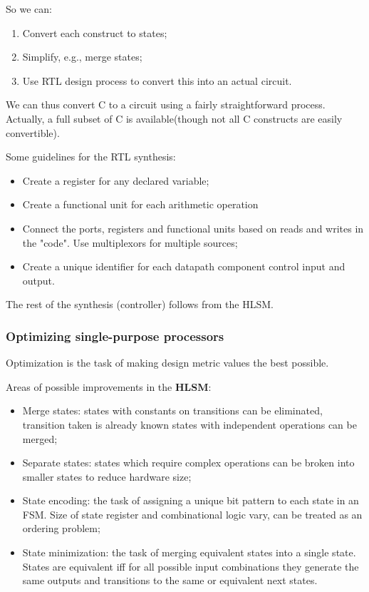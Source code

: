 \documentclass[a4paper,11pt]{article}
\begin{document}
So we can:
\begin{enumerate}
	\item Convert each construct to states;
	\item Simplify, e.g., merge states;
	\item Use RTL design process to convert this into an actual circuit.
\end{enumerate}

We can thus convert C to a circuit using a fairly straightforward process.
Actually, a full subset of C is available(though not all C constructs are easily convertible).

\par\smallskip

Some guidelines for the RTL synthesis:
\begin{itemize}
	\item Create a register for any declared variable;
	\item Create a functional unit for each arithmetic operation
	\item Connect the ports, registers and functional units based on reads and writes in the "code". Use multiplexors for multiple sources;
	\item Create a unique identifier for each datapath component control input and output.
\end{itemize}

The rest of the synthesis (controller) follows from the HLSM.

\subsubsection{Optimizing single-purpose processors}

Optimization is the task of making design metric values the best possible.

Areas of possible improvements in the \textbf{HLSM}:
\begin{itemize}
	\item Merge states: states with constants on transitions can be eliminated, transition taken is already known states with independent operations can be merged;
	\item Separate states: states which require complex operations  can be broken into smaller states to reduce hardware size;
	\item State encoding: the task of assigning a unique bit pattern to each state in an FSM. Size of state register and combinational logic vary, can be treated as an ordering problem;
	\item State minimization: the task of merging equivalent states into a single state. States are equivalent iff for all possible input combinations they generate the same outputs and transitions to the same or equivalent next states.
\end{itemize}
\end{document}
